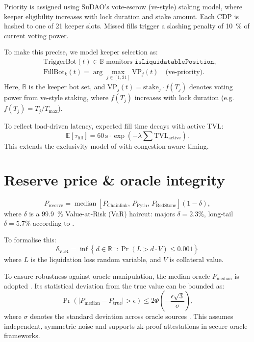 \documentclass[11pt]{article}
\begin{document}
Priority is assigned using SuDAO's vote-escrow (ve-style) staking model, where keeper eligibility increases with lock duration and stake amount. 
Each CDP is hashed to one of 21 keeper slots. Missed fills trigger a slashing penalty of \SI{10}{\percent} of current voting power.

\medskip

To make this precise, we model keeper selection as:
\begin{align*}
&\text{TriggerBot}(t) \in \mathbb{B} \text{ monitors } \texttt{isLiquidatablePosition}, \\
&\text{FillBot}_k(t) = \arg\max_{j \in[1,21]} \text{VP}_j(t) \quad \text{(ve-priority)}.
\end{align*}
Here, \( \mathbb{B} \) is the keeper bot set, and \( \text{VP}_j(t) = \text{stake}_j \cdot f(T_j) \) denotes voting power from ve-style staking, where \( f(T_j) \) increases with lock duration (e.g. \( f(T_j) = T_j / T_{\max} \)).

To reflect load-driven latency, expected fill time decays with active TVL:
\[
\mathbb{E}[\tau_{\text{fill}}] = 60\,\text{s} \cdot \exp\left(-\lambda \sum \text{TVL}_{\text{active}}\right).
\]
This extends the exclusivity model of \textcite{stableunit2025spec} with congestion-aware timing.




\section{Reserve price \& oracle integrity}
\label{sec:reserve}
\[
P_{\text{reserve}} =
\operatorname*{median}\left[
P_{\text{Chainlink}},\,
P_{\text{Pyth}},\,
P_{\text{RedStone}}
\right] (1 - \delta),
\]
where $\delta$ is a \SI{99.9}{\percent} Value-at-Risk (VaR) haircut: majors $\delta = 2.3\%$, long-tail $\delta = 5.7\%$ according to \parencite[Fig.~10]{tian2025defi}.

To formalise this:
\[
\delta_{\text{VaR}} = \inf\left\{ d \in \mathbb{R}^+ : \Pr\left(L > d \cdot V\right) \leq 0.001 \right\}
\]
where \( L \) is the liquidation loss random variable, and \( V \) is collateral value.

\medskip

To ensure robustness against oracle manipulation, the median oracle \( P_{\text{median}} \) is adopted \parencite{eskandari2021sok}. Its statistical deviation from the true value can be bounded as:
\[
\Pr\left(\left| P_{\text{median}} - P_{\text{true}} \right| > \epsilon\right) \leq 2\Phi\left(-\frac{\epsilon\sqrt{3}}{\sigma}\right),
\]
where \( \sigma \) denotes the standard deviation across oracle sources \parencite{deng2024safeguarding}. This assumes independent, symmetric noise and supports zk-proof attestations in secure oracle frameworks.
\end{document}
